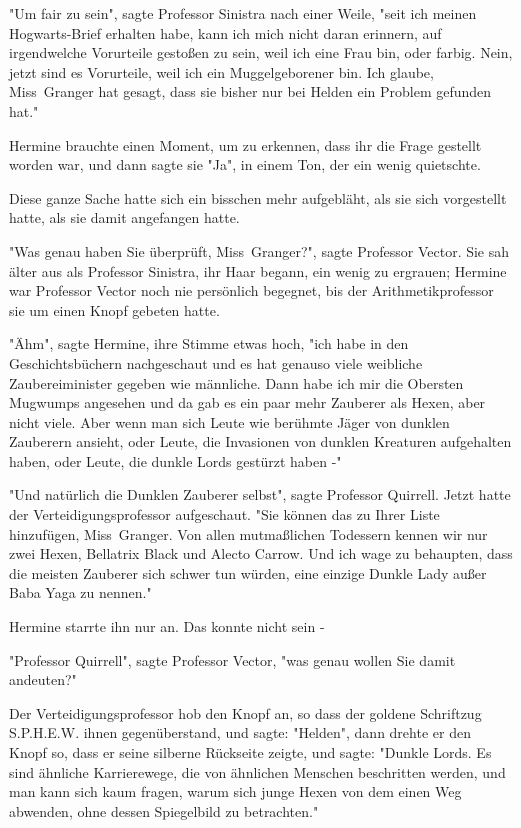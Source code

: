 {"Um fair zu sein", sagte Professor Sinistra nach einer Weile, "seit ich meinen Hogwarts-Brief erhalten habe, kann ich mich nicht daran erinnern, auf irgendwelche Vorurteile gestoßen zu sein, weil ich eine Frau bin, oder farbig. Nein, jetzt sind es Vorurteile, weil ich ein Muggelgeborener bin. Ich glaube, Miss~Granger hat gesagt, dass sie bisher nur bei Helden ein Problem gefunden hat."

Hermine brauchte einen Moment, um zu erkennen, dass ihr die Frage gestellt worden war, und dann sagte sie "Ja", in einem Ton, der ein wenig quietschte.

Diese ganze Sache hatte sich ein bisschen mehr aufgebläht, als sie sich vorgestellt hatte, als sie damit angefangen hatte.

"Was genau haben Sie überprüft, Miss~Granger?", sagte Professor Vector. Sie sah älter aus als Professor Sinistra, ihr Haar begann, ein wenig zu ergrauen; Hermine war Professor Vector noch nie persönlich begegnet, bis der Arithmetikprofessor sie um einen Knopf gebeten hatte.

"Ähm", sagte Hermine, ihre Stimme etwas hoch, "ich habe in den Geschichtsbüchern nachgeschaut und es hat genauso viele weibliche Zaubereiminister gegeben wie männliche. Dann habe ich mir die Obersten Mugwumps angesehen und da gab es ein paar mehr Zauberer als Hexen, aber nicht viele. Aber wenn man sich Leute wie berühmte Jäger von dunklen Zauberern ansieht, oder Leute, die Invasionen von dunklen Kreaturen aufgehalten haben, oder Leute, die dunkle Lords gestürzt haben -"

"Und natürlich die Dunklen Zauberer selbst", sagte Professor Quirrell. Jetzt hatte der Verteidigungsprofessor aufgeschaut. "Sie können das zu Ihrer Liste hinzufügen, Miss~Granger. Von allen mutmaßlichen Todessern kennen wir nur zwei Hexen, Bellatrix Black und Alecto Carrow. Und ich wage zu behaupten, dass die meisten Zauberer sich schwer tun würden, eine einzige Dunkle Lady außer Baba Yaga zu nennen."

Hermine starrte ihn nur an. Das konnte nicht sein -

"Professor Quirrell", sagte Professor Vector, "was genau wollen Sie damit andeuten?"

Der Verteidigungsprofessor hob den Knopf an, so dass der goldene Schriftzug S.P.H.E.W. ihnen gegenüberstand, und sagte: "Helden", dann drehte er den Knopf so, dass er seine silberne Rückseite zeigte, und sagte: "Dunkle Lords. Es sind ähnliche Karrierewege, die von ähnlichen Menschen beschritten werden, und man kann sich kaum fragen, warum sich junge Hexen von dem einen Weg abwenden, ohne dessen Spiegelbild zu betrachten."

}
